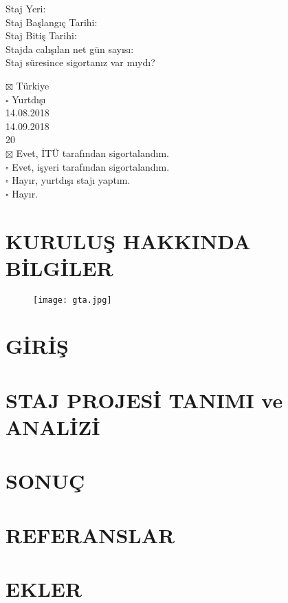 \documentclass[12pt]{article}
\begin{document}
\begin{minipage}[t]{.4\textwidth}
  \begin{flushright}
    Staj Yeri: \\[1\baselineskip]
    Staj Başlangıç Tarihi: \\
    Staj Bitiş Tarihi: \\
    Stajda calışılan net gün sayısı: \\
    Staj süresince sigortanız var mıydı?
  \end{flushright}
\end{minipage}%
\hspace{0.5cm}
\begin{minipage}[t]{.6\textwidth}
  $\boxtimes$ Türkiye \\
  $\square$ Yurtdışı \\
  14.08.2018 \\
  14.09.2018 \\
  20 \\
  $\boxtimes$ Evet, İTÜ tarafından sigortalandım. \\
  $\square$ Evet, işyeri tarafından sigortalandım. \\
  $\square$ Hayır, yurtdışı stajı yaptım. \\
  $\square$ Hayır.
\end{minipage}

\newpage
{}
\section*{KURULUŞ HAKKINDA BİLGİLER}
\blindtext
 \begin{figure}[h!]
  \centering
  \texttt{[image: gta.jpg]}
  \caption{}
\end{figure}

\section*{GİRİŞ}
\blindtext
\section*{STAJ PROJESİ TANIMI ve ANALİZİ}
\blindtext
\section*{SONUÇ}
\blindtext
\section*{REFERANSLAR}
\blindtext
\section*{EKLER}
\blindtext
\end{document}
